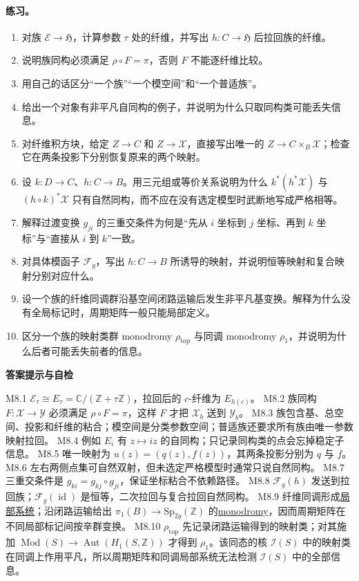\documentclass[UTF8,fontset=none,a4paper,11pt]{ctexart}
\theoremstyle{foundation-definition}
\theoremstyle{foundation-theorem}
\theoremstyle{foundation-proposition}
\theoremstyle{foundation-example}
\theoremstyle{foundation-remark}
\theoremstyle{foundation-theorem}
\newcommand{\Mod}{\operatorname{Mod}}
\newcommand{\term}[2]{\hyperref[#1]{#2}}
\newenvironment{answerkey}{%
\begin{mdframed}[backgroundcolor=examplebg,linecolor=examplepurple,linewidth=1.0pt,
  leftline=true,rightline=false,topline=false,bottomline=false,
  skipabove=7pt,skipbelow=8pt,innerleftmargin=10pt,innerrightmargin=8pt,
  innertopmargin=6pt,innerbottommargin=6pt]
{\sffamily\bfseries\color{examplepurple}答案提示与自检}\par\smallskip\small
}{\end{mdframed}}
\begin{document}
\paragraph{练习。}
\begin{enumerate}[label=M8.\arabic*.]
  \item 对族 \(\mathcal E\to\mathfrak H\)，计算参数 \(\tau\) 处的纤维，并写出 \(h:C\to\mathfrak H\) 后拉回族的纤维。
  \item 说明族同构必须满足 \(\rho\circ F=\pi\)，否则 \(F\) 不能逐纤维比较。
  \item 用自己的话区分“一个族”“一个模空间”和“一个普适族”。
  \item 给出一个对象有非平凡自同构的例子，并说明为什么只取同构类可能丢失信息。
  \item 对纤维积方块，给定 \(Z\to C\) 和 \(Z\to\mathcal X\)，直接写出唯一的 \(Z\to C\times_B\mathcal X\)；检查它在两条投影下分别恢复原来的两个映射。
  \item 设 \(k:D\to C\)、\(h:C\to B\)。用三元组或等价关系说明为什么 \(k^*(h^*\mathcal X)\) 与 \((h\circ k)^*\mathcal X\) 只有自然同构，而不应在没有选定模型时武断地写成严格相等。
  \item 解释过渡变换 \(g_{ji}\) 的三重交条件为何是“先从 \(i\) 坐标到 \(j\) 坐标、再到 \(k\) 坐标”与“直接从 \(i\) 到 \(k\)”一致。
  \item 对具体模函子 \(\mathcal F_g\)，写出 \(h:C\to B\) 所诱导的映射，并说明恒等映射和复合映射分别对应什么。
  \item 设一个族的纤维同调群沿基空间闭路运输后发生非平凡基变换。解释为什么没有全局标记时，周期矩阵一般只能局部定义。
  \item 区分一个族的映射类群 monodromy \(\rho_{\mathrm{top}}\) 与同调 monodromy
    \(\rho_1\)，并说明为什么后者可能丢失前者的信息。
\end{enumerate}

\begin{answerkey}
M8.1 \(\mathcal E_\tau\cong E_\tau=\mathbb C/(\mathbb Z+\tau\mathbb Z)\)，拉回后的 \(c\)-纤维为 \(E_{h(c)}\)。
M8.2 族同构 \(F:\mathcal X\to\mathcal Y\) 必须满足 \(\rho\circ F=\pi\)，这样 \(F\) 才把 \(\mathcal X_b\) 送到 \(\mathcal Y_b\)。
M8.3 族包含基、总空间、投影和纤维的粘合；模空间是分类参数空间；普适族还要求所有族由唯一参数映射拉回。
M8.4 例如 \(E_i\) 有 \(z\mapsto iz\) 的自同构；只记录同构类的点会忘掉稳定子信息。
M8.5 唯一映射为 \(u(z)=(q(z),f(z))\)，其两条投影分别为 \(q\) 与 \(f\)。
M8.6 左右两侧点集可自然双射，但未选定严格模型时通常只说自然同构。
M8.7 三重交条件是 \(g_{ki}=g_{kj}\circ g_{ji}\)，保证坐标粘合不依赖路径。
M8.8 \(\mathcal F_g(h)\) 发送到拉回族；\(\mathcal F_g(\operatorname{id})\) 是恒等，二次拉回与复合拉回自然同构。
M8.9 纤维同调形成\term{def:local-system}{局部系统}；沿闭路运输给出
\(\pi_1(B)\to\mathrm{Sp}_{2g}(\mathbb Z)\) 的\term{def:monodromy}{monodromy}，因而周期矩阵在不同局部标记间按辛群变换。
M8.10 \(\rho_{\mathrm{top}}\) 先记录闭路运输得到的映射类；对其施加
\(\Mod(S)\to\operatorname{Aut}(H_1(S,\mathbb Z))\) 才得到 \(\rho_1\)。该同态的核
\(\mathcal I(S)\) 中的映射类在同调上作用平凡，所以周期矩阵和同调局部系统无法检测
\(\mathcal I(S)\) 中的全部信息。
\end{answerkey}
\end{document}
